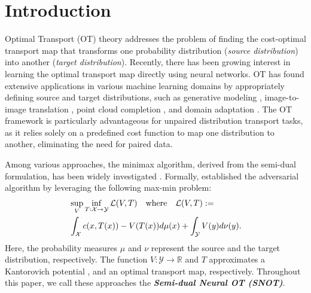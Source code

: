 \section{Introduction}
Optimal Transport (OT) theory \citep{villani, ComputationalOT} addresses the problem of finding the cost-optimal transport map that transforms one probability distribution (\textit{source distribution}) into another (\textit{target distribution}). Recently, there has been growing interest in learning the optimal transport map directly using neural networks. OT has found extensive applications in various machine learning domains by appropriately defining source and target distributions, such as generative modeling \citep{otm, uotm, sjko, choi2024scalable}, image-to-image translation \citep{not, fanscalable}, point cloud completion \citep{uot-upc}, and domain adaptation \citep{da-ot}.
The OT framework is particularly advantageous for unpaired distribution transport tasks, as it relies solely on a predefined cost function to map one distribution to another, eliminating the need for paired data.

Among various approaches, the minimax algorithm, derived from the semi-dual formulation, has been widely investigated \cite{fanscalable, otm, uotm, uotmsd}.
Formally, \citet{fanscalable, otm} established the adversarial algorithm by leveraging the following max-min problem:
\begin{equation} 
\label{eq:problem}
\begin{aligned}
    &\sup_{V} \inf_{T:\mathcal{X} \rightarrow \mathcal{Y}}
    \mathcal{L}(V, T)
    \quad \hbox{where} \quad \mathcal{L}(V, T):= 
    \\
    & \int_{\mathcal{X}} c(x, T(x)) - V(T(x)) d\mu(x) + \int_{\mathcal{Y}} V(y) d\nu(y) .   
\end{aligned}    
\end{equation}
Here, the probability measures $\mu$ and $\nu$ represent the source and the target distribution, respectively. 
The function $V:\mathcal{Y} \rightarrow \mathbb{R}$ and $T$ approximates a Kantorovich potential \cite{Kantorovich1948}, and an optimal transport map, respectively. Throughout this paper, we call these approaches the \textit{\textbf{Semi-dual Neural OT (SNOT)}}.


